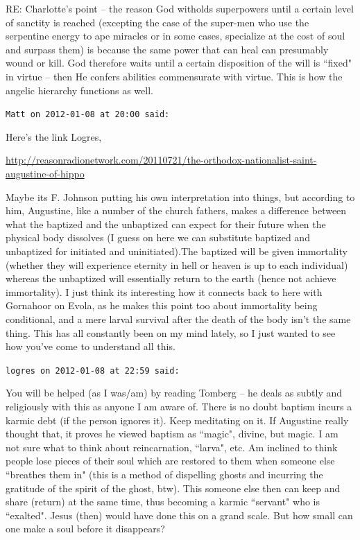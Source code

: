 \begin{footnotesize}
\begin{sffamily}
RE: Charlotte's point – the reason God witholds superpowers until a certain level of sanctity is reached (excepting the case of the super-men who use the serpentine energy to ape miracles or in some cases, specialize at the cost of soul and surpass them) is because the same power that can heal can presumably wound or kill. God therefore waits until a certain disposition of the will is ``fixed" in virtue – then He confers abilities commensurate with virtue. This is how the angelic hierarchy functions as well.


\hfill

\texttt{Matt on 2012-01-08 at 20:00 said: }

Here's the link Logres,

\url{http://reasonradionetwork.com/20110721/the-orthodox-nationalist-saint-augustine-of-hippo}

Maybe its F. Johnson putting his own interpretation into things, but according to him, Augustine, like a number of the church fathers, makes a difference between what the baptized and the unbaptized can expect for their future when the physical body dissolves (I guess on here we can substitute baptized and unbaptized for initiated and uninitiated).The baptized will be given immortality (whether they will experience eternity in hell or heaven is up to each individual) whereas the unbaptized will essentially return to the earth (hence not achieve immortality). I just think its interesting how it connects back to here with Gornahoor on Evola, as he makes this point too about immortality being conditional, and a mere larval survival after the death of the body isn't the same thing. This has all constantly been on my mind lately, so I just wanted to see how you've come to understand all this.


\hfill

\texttt{logres on 2012-01-08 at 22:59 said: }

You will be helped (as I was/am) by reading Tomberg – he deals as subtly and religiously with this as anyone I am aware of. There is no doubt baptism incurs a karmic debt (if the person ignores it). Keep meditating on it. If Augustine really thought that, it proves he viewed baptism as ``magic", divine, but magic. I am not sure what to think about reincarnation, ``larva", etc. Am inclined to think people lose pieces of their soul which are restored to them when someone else ``breathes them in" (this is a method of dispelling ghosts and incurring the gratitude of the spirit of the ghost, btw). This someone else then can keep and share (return) at the same time, thus becoming a karmic ``servant" who is ``exalted". Jesus (then) would have done this on a grand scale. But how small can one make a soul before it disappears?



\end{sffamily}
\end{footnotesize}
